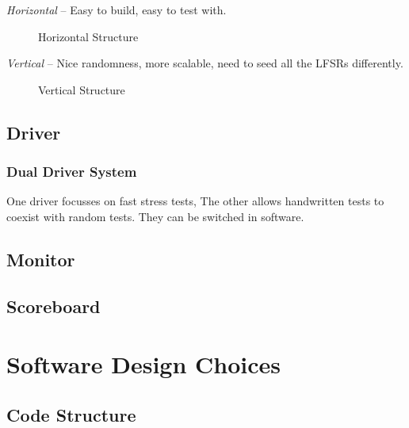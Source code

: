 \textit{Horizontal} --
Easy to build, easy to test with.

\begin{figure}[ht]
  \centering
  
  \caption{Horizontal Structure}
  \label{HoriLFSR}
\end{figure}

\textit{Vertical} --
Nice randomness, more scalable, need to seed all the LFSRs differently.

\begin{figure}[ht]
  \centering
  
  \caption{Vertical Structure}
  \label{VertLFSR}
\end{figure}

\subsection{Driver}
\subsubsection{Dual Driver System}
One driver focusses on fast stress tests,
The other allows handwritten tests to coexist with random tests.
They can be switched in software.

\subsection{Monitor}


\subsection{Scoreboard}

\section{Software Design Choices}

\subsection{Code Structure}
